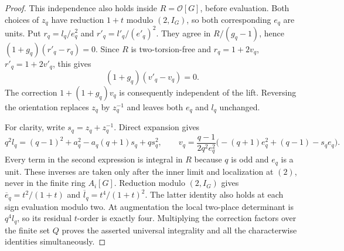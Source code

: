 \documentclass[11pt]{article}
\theoremstyle{definition}
\theoremstyle{remark}
\providecommand{\mathscr}[1]{\mathcal{#1}}
\begin{document}
\begin{proof}
This independence also holds inside $R=\mathscr O[G]$, before
evaluation. Both choices of $z_q$ have reduction $1+t$ modulo
$(2,I_G)$, so both corresponding $e_q$ are units. Put
$r_q=l_q/e_q^2$ and $r'_q=l'_q/(e'_q)^2$. They agree in
$R/(g_q-1)$, hence $(1+g_q)(r'_q-r_q)=0$. Since $R$ is
two-torsion-free and $r_q=1+2v_q$, $r'_q=1+2v'_q$, this gives
\[
 (1+g_q)(v'_q-v_q)=0.
\]
The correction $1+(1+g_q)v_q$ is consequently independent of the
lift. Reversing the orientation replaces $z_q$ by $z_q^{-1}$
and leaves both $e_q$ and $l_q$ unchanged.

For clarity, write $s_q=z_q+z_q^{-1}$. Direct expansion gives
\[
 q^2l_q=(q-1)^2+a_q^2-a_q(q+1)s_q+qs_q^2,
 \qquad
 v_q=\frac{q-1}{2q^2e_q^2}
       \bigl(-(q+1)e_q^2+(q-1)-s_qe_q\bigr).
\]
Every term in the second expression is integral in $R$ because
$q$ is odd and $e_q$ is a unit. These inverses are taken only
after the inner limit and localization at $(2)$, never in the
finite ring $A_i[G]$. Reduction modulo $(2,I_G)$ gives
$\overline e_q=t^2/(1+t)$ and
$\overline l_q=t^4/(1+t)^2$. The latter identity also holds at
each sign evaluation modulo two. At augmentation the local
two-place determinant is $q^4l_q$, so its residual $t$-order is
exactly four. Multiplying the correction factors over the finite
set $Q$ proves the asserted universal integrality and all the
characterwise identities simultaneously.
\end{proof}
\end{document}
